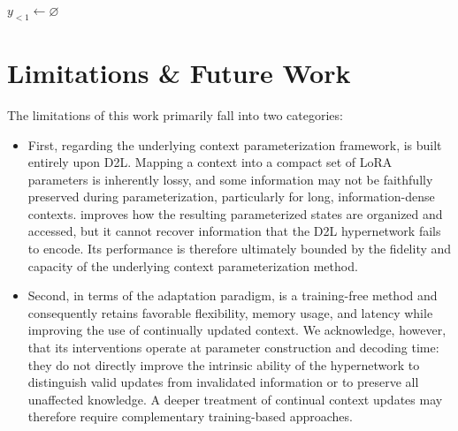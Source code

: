 \begin{algorithm}[t]
\tcc{\textbf{\amd{}}}
$y_{<1} \leftarrow \varnothing$\;
\;
\end{algorithm}

\section{Limitations \& Future Work}
\label{app:limitations-future-work}

The limitations of this work primarily fall into two categories:

\begin{itemize}
    \item First, regarding the underlying context parameterization framework, \method{} is built entirely upon D2L. Mapping a context into a compact set of LoRA parameters is inherently lossy, and some information may not be faithfully preserved during parameterization, particularly for long, information-dense contexts. \method{} improves how the resulting parameterized states are organized and accessed, but it cannot recover information that the D2L hypernetwork fails to encode. Its performance is therefore ultimately bounded by the fidelity and capacity of the underlying context parameterization method.
    \item Second, in terms of the adaptation paradigm, \method{} is a training-free method and consequently retains favorable flexibility, memory usage, and latency while improving the use of continually updated context. We acknowledge, however, that its interventions operate at parameter construction and decoding time: they do not directly improve the intrinsic ability of the hypernetwork to distinguish valid updates from invalidated information or to preserve all unaffected knowledge. A deeper treatment of continual context updates may therefore require complementary training-based approaches.
\end{itemize}

